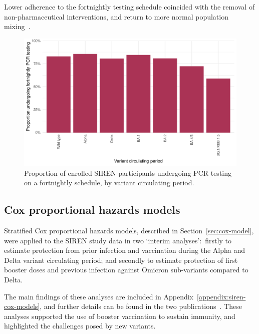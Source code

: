 Lower adherence to the fortnightly testing schedule coincided with the removal of non-pharmaceutical interventions, and return to more normal population mixing~\parencite{Department_of_Health_and_Social_Care2020-ez, Smith2022-iv}.
\newline

\begin{figure}[htbp!]
    \centering
    \includegraphics[width=\textwidth]{fortnightly_schedule.pdf}
    \caption[Proportion of enrolled SIREN participants undergoing PCR testing on a fortnightly schedule, by variant circulating period]{Proportion of enrolled SIREN participants undergoing PCR testing on a fortnightly schedule, by variant circulating period.}\label{fig:fortnightly_schedule}
\end{figure}

\subsection{Cox proportional hazards models}

Stratified Cox proportional hazards models, described in Section~\ref{sec:cox-model}, were applied to the SIREN study data in two `interim analyses':\ firstly to estimate protection from prior infection and vaccination during the Alpha and Delta variant circulating period; and secondly to estimate protection of first booster doses and previous infection against Omicron sub-variants compared to Delta.

The main findings of these analyses are included in Appendix~\ref{appendix:siren-cox-models}, and further details can be found in the two publications~\parencite{Hall2022-ep, Hall2024-ai}. These analyses supported the use of booster vaccination to sustain immunity, and highlighted the challenges posed by new variants.


